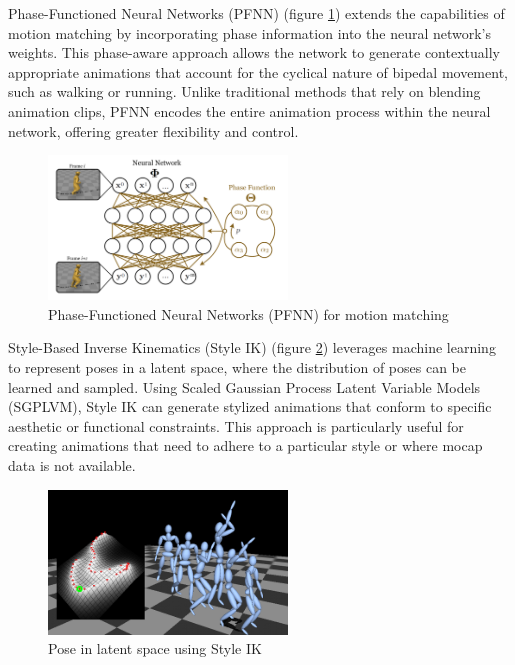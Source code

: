 \documentclass[../../main.tex]{subfiles}
\begin{document}
Phase-Functioned Neural Networks (PFNN) \cite{10.1145/3072959.3073663} (figure \ref{fig:pfnn})  extends the capabilities of motion matching by incorporating phase information into the neural network's weights. This phase-aware approach allows the network to generate contextually appropriate animations that account for the cyclical nature of bipedal movement, such as walking or running. Unlike traditional methods that rely on blending animation clips, PFNN encodes the entire animation process within the neural network, offering greater flexibility and control.

\begin{figure}
  \centering \includegraphics[width = 2.5in]{chapters/motion_matching/images/pfnn.png}
  \caption{Phase-Functioned Neural Networks (PFNN) for motion matching}
  \label{fig:pfnn}
\end{figure}

Style-Based Inverse Kinematics (Style IK) (figure \ref{fig:style_ik}) leverages machine learning to represent poses in a latent space, where the distribution of poses can be learned and sampled. Using Scaled Gaussian Process Latent Variable Models (SGPLVM), Style IK can generate stylized animations that conform to specific aesthetic or functional constraints. This approach is particularly useful for creating animations that need to adhere to a particular style or where mocap data is not available\cite{grochow2004style}.

\begin{figure}
  \centering \includegraphics[width = 2.5in]{chapters/motion_matching/images/style_ik.png}
  \caption{Pose in latent space using Style IK}
  \label{fig:style_ik}
\end{figure}
\end{document}
